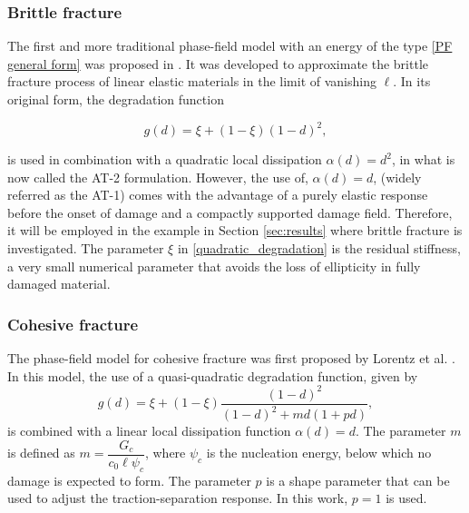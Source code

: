 \subsubsection{Brittle fracture}

The first and more traditional phase-field model with an energy of the type \eqref{PF general form} was proposed in \cite{bourdin2000numerical}. It was developed to approximate the brittle fracture process of linear elastic materials in the limit of vanishing $\ell$. In its original form, the degradation function 

\begin{equation}\label{quadratic_degradation}
    g(d) = \xi + (1-\xi)(1-d)^2,
\end{equation}

\noindent is used in combination with a quadratic local dissipation $\alpha(d) = d^2$, in what is now called the AT-2 formulation. However, the use of, $\alpha(d) = d$, (widely referred as the AT-1) comes with the advantage of a purely elastic response before the onset of damage and a compactly supported damage field. Therefore, it will be employed in the example in Section \ref{sec:results} where brittle fracture is investigated. The parameter $\xi$ in \eqref{quadratic_degradation} is the residual stiffness, a very small numerical parameter that avoids the loss of ellipticity in fully damaged material.

\subsubsection{Cohesive fracture}\label{cohesive_frac}

The phase-field model for cohesive fracture was first proposed by Lorentz et al. \cite{lorentz2011convergence, lorentz2011gradient}. In this model, the use of a quasi-quadratic degradation function, given by
\begin{equation}\label{cohesive_degradation}
    g(d) = \xi + (1-\xi)\dfrac{(1-d)^2}{(1-d)^2+md(1+pd)},
\end{equation}
is combined with a linear local dissipation function $\alpha(d) = d$.  The parameter $m$ is defined as $m = \dfrac{G_c}{c_0\ell\psi_c}$, where $\psi_c$ is the nucleation energy, below which no damage is expected to form.  The parameter $p$ is a shape parameter that can be used to adjust the traction-separation response.  In this work, $p=1$ is used.  